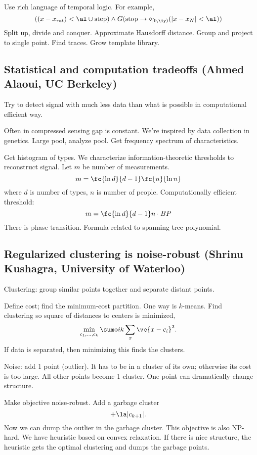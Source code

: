 Use rich language of temporal logic. 
For example,
$$
((x-x_{ret})<\al \cup \text{step}) \wedge G(\text{stop}\to \diamond_{[0,\iy)} (|x-x_N|<\al))
$$
Split up, divide and conquer. Approximate Hausdorff distance. Group and project to single point. Find traces. Grow template library.

\subsection{Statistical and computation tradeoffs (Ahmed Alaoui, UC Berkeley)}

Try to detect signal with much less data than what is possible in computational efficient way.

Often in compressed sensing gap is constant.  We're inspired by data collection in genetics.
Large pool, analyze pool. Get frequency spectrum of characteristics.

Get histogram of types. We characterize information-theoretic thresholds to reconstruct signal. Let $m$ be number of measurements.
$$
m = \fc{\ln d}{d-1}\fc{n}{\ln n}
$$
where $d$ is number of types, $n$ is number of people. Computationally efficient threshold:
$$
m=\fc{\ln d}{d-1}n \cdot BP
$$
There is phase transition.
Formula related to spanning tree polynomial.

\subsection{Regularized clustering is noise-robust (Shrinu Kushagra, University of Waterloo)}

Clustering: group similar points together and separate distant points. 

Define cost; find the minimum-cost partition. One way is $k$-means. Find clustering so square of distances to centers is minimized, 
$$
\min_{c_1,\ldots, c_k}  \sumo ik \sum_x \ve{x-c_i}^2.
$$
If data is separated, then minimizing this finds the clusters. 

Noise: add 1 point (outlier). It has to be in a cluster of its own; otherwise its cost is too large. All other points become 1 cluster. One point can dramatically change structure.

Make objective noise-robust. Add a garbage cluster
$$
+ \la |c_{k+1}|.
$$
Now we can dump the outlier in the garbage cluster. This objective is also NP-hard. We have heuristic based on convex relaxation. If there is nice structure, the heuristic gets the optimal clustering and dumps the garbage points.

